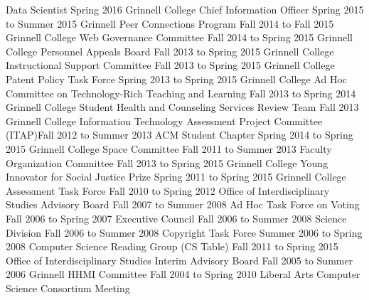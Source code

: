 \begin{cventries}
  {Data Scientist}
  {Spring 2016}
  {Grinnell College Chief Information Officer}
  {Spring 2015 to Summer 2015}
  {Grinnell Peer Connections Program}
  {Fall 2014 to Fall 2015}
  {Grinnell College Web Governance Committee}
  {Fall 2014 to Spring 2015}
  {Grinnell College Personnel Appeals Board}
  {Fall 2013 to Spring 2015}
  {Grinnell College Instructional Support Committee}
  {Fall 2013 to Spring 2015}
  {Grinnell College Patent Policy Task Force}
  {Spring 2013 to Spring 2015}
  {Grinnell College Ad Hoc Committee on Technology-Rich Teaching and Learning}
  {Fall 2013 to Spring 2014}
  {Grinnell College Student Health and Counseling Services Review Team}
  {Fall 2013}
  {Grinnell College Information Technology Assessment Project Committee (ITAP)}{Fall 2012 to Summer 2013}
  {ACM Student Chapter}
  {Spring 2014 to Spring 2015}
  {Grinnell College Space Committee}
  {Fall 2011 to Summer 2013}
  {Faculty Organization Committee}
  {Fall 2013 to Spring 2015}
  {Grinnell College Young Innovator for Social Justice Prize}
  {Spring 2011 to Spring 2015}
  {Grinnell College Assessment Task Force}
  {Fall 2010 to Spring 2012}
  {Office of Interdisciplinary Studies Advisory Board}
  {Fall 2007 to Summer 2008}
  {Ad Hoc Task Force on Voting}
  {Fall 2006 to Spring 2007}
  {Executive Council}
  {Fall 2006 to Summer 2008}
  {Science Division}
  {Fall 2006 to Summer 2008}
  {Copyright Task Force}
  {Summer 2006 to Spring 2008}
  {Computer Science Reading Group (CS Table)}
  {Fall 2011 to Spring 2015}
  {Office of Interdisciplinary Studies Interim Advisory Board}
  {Fall 2005 to Summer 2006}
  {Grinnell HHMI Committee}
  {Fall 2004 to Spring 2010}
  {Liberal Arts Computer Science Consortium Meeting}

\end{cventries}
